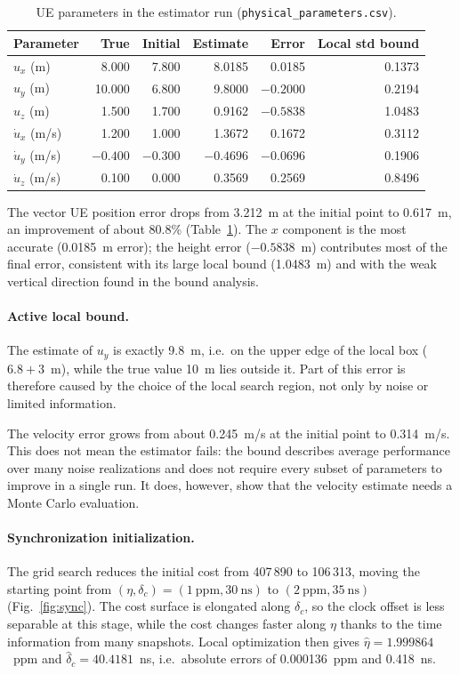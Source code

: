 \documentclass[11pt,a4paper]{article}
\begin{document}
\begin{table}[H]
\centering
\caption{UE parameters in the estimator run (\texttt{physical\_parameters.csv}).}
\label{tab:ue}
\begin{tabular}{lrrrrr}
\toprule
Parameter & True & Initial & Estimate & Error & Local std bound\\
\midrule
$u_x$ (m) & 8.000 & 7.800 & 8.0185 & 0.0185 & 0.1373\\
$u_y$ (m) & 10.000 & 6.800 & 9.8000 & $-0.2000$ & 0.2194\\
$u_z$ (m) & 1.500 & 1.700 & 0.9162 & $-0.5838$ & 1.0483\\
$\dot u_x$ (m/s) & 1.200 & 1.000 & 1.3672 & 0.1672 & 0.3112\\
$\dot u_y$ (m/s) & $-0.400$ & $-0.300$ & $-0.4696$ & $-0.0696$ & 0.1906\\
$\dot u_z$ (m/s) & 0.100 & 0.000 & 0.3569 & 0.2569 & 0.8496\\
\bottomrule
\end{tabular}
\end{table}

The vector UE position error drops from 3.212~m at the initial point to 0.617~m, an improvement of about 80.8\%
(Table~\ref{tab:ue}). The $x$ component is the most accurate (0.0185~m error); the height error
($-0.5838$~m) contributes most of the final error, consistent with its large local bound (1.0483~m) and with the
weak vertical direction found in the bound analysis.

\paragraph{Active local bound.} The estimate of $u_y$ is exactly 9.8~m, i.e.\ on the upper edge of the local box
($6.8+3$~m), while the true value 10~m lies outside it. Part of this error is therefore caused by the choice of the
local search region, not only by noise or limited information.

The velocity error grows from about 0.245~m/s at the initial point to 0.314~m/s. This does not mean the estimator
fails: the bound describes average performance over many noise realizations and does not require every subset of
parameters to improve in a single run. It does, however, show that the velocity estimate needs a Monte Carlo
evaluation.

\paragraph{Synchronization initialization.} The grid search reduces the initial cost from 407\,890 to
106\,313, moving the starting point from $(\eta,\delta_c)=(1~\text{ppm},30~\text{ns})$ to $(2~\text{ppm},35~\text{ns})$
(Fig.~\ref{fig:sync}). The cost surface is elongated along $\delta_c$, so the clock offset is less separable at
this stage, while the cost changes faster along $\eta$ thanks to the time information from many snapshots. Local
optimization then gives $\hat\eta=1.999864$~ppm and $\hat\delta_c=40.4181$~ns, i.e.\ absolute errors of
0.000136~ppm and 0.418~ns.
\end{document}
